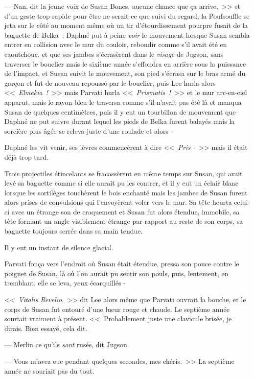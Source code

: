--- Nan, dit la jeune voix de Susan Bones, aucune chance que ça arrive,~>> et d'un geste trop rapide pour être ne serait-ce que suivi du regard, la Poufsouffle se jeta sur le côté au moment même où un tir d'étourdissement pourpre fusait de la baguette de Belka~; Daphné put à peine \emph{voir} le mouvement lorsque Susan sembla entrer en collision avec le mur du couloir, rebondir comme s'il avait été en caoutchouc, et que ses jambes s'écrasèrent dans le \emph{visage} de Jugson, sans traverser le bouclier mais le sixième année s'effondra en arrière sous la puissance de l'impact, et Susan suivit le mouvement, son pied s'écrasa sur le bras armé du garçon et fut de nouveau repoussé par le bouclier, puis Lee hurla alors <<~\emph{Elmekia~!}~>> mais Parvati hurla <<~\emph{Prismatis~!}~>> et le mur arc-en-ciel apparut, mais le rayon bleu le traversa comme s'il n'avait pas été là et manqua Susan de quelques centimètres, puis il y eut un tourbillon de mouvement que Daphné ne put suivre durant lequel les pieds de Belka furent balayés mais la sorcière plus âgée se releva juste d'une roulade et alors -

Daphné les vit venir, ses lèvres commencèrent à dire <<~\emph{Pris -}~>> mais il était déjà trop tard.

Trois projectiles étincelants se fracassèrent en même temps sur Susan, qui avait levé sa baguette comme si elle aurait pu les contrer, et il y eut un éclair blanc lorsque les sortilèges touchèrent le bois enchanté mais les jambes de Susan furent alors prises de convulsions qui l'envoyèrent voler vers le mur. Sa tête heurta celui-ci avec un étrange son de craquement et Susan fut alors étendue, immobile, sa tête formant un angle visiblement étrange par-rapport au reste de son corps, sa baguette toujours serrée dans sa main tendue.

Il y eut un instant de silence glacial.

Parvati fonça vers l'endroit où Susan était étendue, pressa son pouce contre le poignet de Susan, là où l'on aurait pu sentir son pouls, puis, lentement, en tremblant, elle se leva, yeux écarquillés -

<<~\emph{Vitalis Revelio},~>> dit Lee alors même que Parvati ouvrait la bouche, et le corps de Susan fut entouré d'une lueur rouge et chaude. Le septième année souriait vraiment à présent. <<~Probablement juste une clavicule brisée, je dirais. Bien essayé, cela dit.

--- Merlin ce qu'ils \emph{sont} rusés, dit Jugson.

--- Vous m'avez eue pendant quelques secondes, mes chéris.~>> La septième année ne souriait pas du tout.

